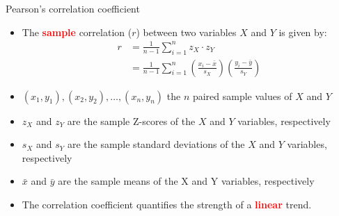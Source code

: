 \documentclass[10pt]{beamer}\usepackage[]{graphicx}\usepackage[]{color}
\begin{document}
						
						\begin{frame}{Pearson's correlation coefficient}
							\protect\hypertarget{two-numerical-variables}{}
							
								\begin{itemize}
							
							\item The \textbf{\textcolor{red}{sample}} correlation ($r$) between two variables $X$ and $Y$ is given by:							
							\begin{align}
							r &= \frac{1}{n-1} \sum_{i=1}^n z_X \cdot z_Y \\ 
							&=\frac{1}{n-1} \sum_{i=1}^{n}\left(\frac{x_{i}-\bar{x}}{s_{X}}\right)\left(\frac{y_{i}-\bar{y}}{s_{Y}}\right)
							\end{align}
							
							\item $\left(x_{1}, y_{1}\right),\left(x_{2}, y_{2}\right), \ldots,\left(x_{n}, y_{n}\right)$ the $n$ paired sample values of $X$ and $Y$
							
							\item $z_{X}$ and $z_{Y}$ are the sample Z-scores of the $X$ and $Y$ variables, respectively 
							
							\item $s_{X}$ and $s_{Y}$ are the sample standard deviations of the $X$ and $Y$ variables, respectively 
							
							\item $\bar{x}$ and $\bar{y}$ are the sample means of the X and Y variables, respectively
							
							
							\pause 
							
							\item The correlation coefficient quantifies the strength of a \textbf{\textcolor{red}{linear}} trend.
							
						
													\end{itemize}
							
							
						\end{frame}
						
\end{document}

